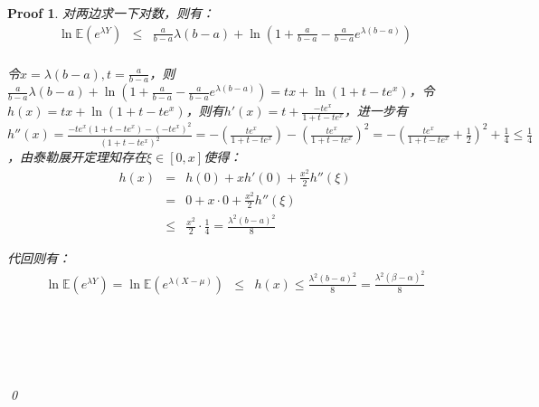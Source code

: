 \documentclass[a4paper,UTF8]{article}
\numberwithin{equation}{section}
\newtheorem*{myProof}{Proof}
\begin{document}
\begin{myProof}
对两边求一下对数，则有：
\begin{eqnarray*}
	\ln \mathbb{E}(e^{\lambda Y}) &\le& \frac{a}{b - a} \lambda (b - a) + \ln \left(1 + \frac{a}{b - a} - \frac{a}{b - a}e^{\lambda (b - a)} \right) \\
\end{eqnarray*}

令$x = \lambda (b - a), t = \frac{a}{b - a}$，则$\frac{a}{b - a} \lambda (b - a) + \ln \left(1 + \frac{a}{b - a} - \frac{a}{b - a}e^{\lambda (b - a)} \right) = tx + \ln ( 1 + t - t e^x )$，令$h(x) = tx + \ln ( 1 + t - t e^x )$，则有$h'(x) = t + \frac{-te^x}{1 + t - te^x}$，进一步有$h''(x) = \frac{-te^x(1 + t - te^x) - (-te^x)^2}{(1 + t - te^x)^2} = -\left(\frac{te^x}{1 + t - te^x} \right)-\left(\frac{te^x}{1 + t - te^x} \right)^2 = -\left(\frac{te^x}{1 + t - te^x} + \frac{1}{2} \right)^2 + \frac{1}{4} \le \frac{1}{4}$，由泰勒展开定理知存在$\xi \in [0, x]$使得：
\begin{eqnarray*}
h(x) &=& h(0) + xh'(0) + \frac{x^2}{2} h''(\xi) \\
&=& 0 + x \cdot 0 + \frac{x^2}{2} h''(\xi) \\
&\le&  \frac{x^2}{2} \cdot \frac{1}{4} = \frac{\lambda^2(b-a)^2}{8}
\end{eqnarray*}

代回则有：
\begin{eqnarray*}
	\ln \mathbb{E}(e^{\lambda Y}) = \ln \mathbb{E}(e^{\lambda(X - \mu)}) &\le& h(x) \le \frac{\lambda^2(b-a)^2}{8} = \frac{\lambda^2(\beta-\alpha)^2}{8} \\
\end{eqnarray*}


	~\\
	~\\
	~\\
	~\\
	\qed
\end{myProof}
\newpage
\end{document}
